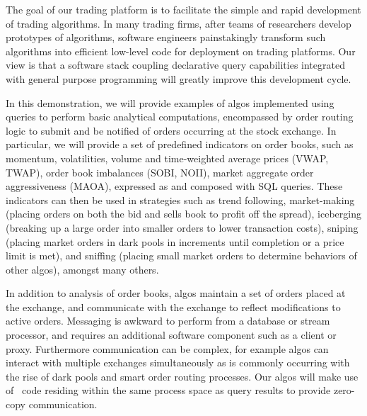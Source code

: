 The goal of our trading platform is to facilitate the simple and rapid
development of trading algorithms. In many trading firms, after teams of
researchers develop prototypes of algorithms, software engineers painstakingly
transform such algorithms into efficient low-level code for deployment on
trading platforms. Our view is that a software stack coupling declarative query
capabilities integrated with general purpose programming will greatly improve
this development cycle.

In this demonstration, we will provide examples of algos implemented using
queries to perform basic analytical computations, encompassed by order routing
logic to submit and be notified of orders occurring at the stock exchange.  In
particular, we will provide a set of predefined indicators on order books, such
as momentum, volatilities, volume and time-weighted average prices (VWAP, TWAP),
order book imbalances (SOBI, NOII), market aggregate order aggressiveness
(MAOA), expressed as and composed with SQL queries. These indicators can then be
used in strategies such as trend following, market-making (placing orders on
both the bid and sells book to profit off the spread), iceberging (breaking up a
large order into smaller orders to lower transaction costs), sniping (placing
market orders in dark pools in increments until completion or a price limit is
met), and sniffing (placing small market orders to determine behaviors of other
algos), amongst many others.

In addition to analysis of order books, algos maintain a set of orders placed at
the exchange, and communicate with the exchange to reflect modifications to
active orders. Messaging is awkward to perform from a database or stream
processor, and requires an additional software component such as a client or
proxy. Furthermore communication can be complex, for example algos can interact
with multiple exchanges simultaneously as is commonly occurring with the rise of
dark pools and smart order routing processes. Our algos will make use of
\targetlang\ code residing within the same process space as query results to
provide zero-copy communication.




